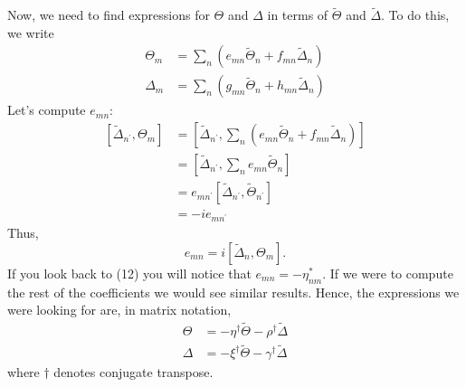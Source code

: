\documentclass[letterpaper]{article}
\newcommand{\iip}[2]{\ensuremath{\left[#1,#2\right]}}
\newcommand{\DeltaT}{\ensuremath{\tilde{\Delta}}}
\newcommand{\ThetaT}{\ensuremath{\tilde{\Theta}}}
\begin{document}
Now, we need to find expressions for $\Theta$ and $\Delta$ in terms of $\ThetaT$ and
$\DeltaT$. To do this, we write
\begin{align}
\Theta_m&=\sum_n\left(e_{mn}\ThetaT_n+f_{mn}\DeltaT_n\right)\\
\Delta_m&=\sum_n\left(g_{mn}\ThetaT_n+h_{mn}\DeltaT_n\right)
\end{align}
Let's compute $e_{mn}$:
\begin{align}
\iip{\DeltaT_{n^\prime}}{\Theta_m}&=\iip{\DeltaT_{n^\prime}}{\sum_n\left(e_{mn}\ThetaT_n+f_{mn}\DeltaT_n\right)}\\
&=\iip{\DeltaT_{n^\prime}}{\sum_n e_{mn}\ThetaT_n}\\
&=e_{mn^\prime}\iip{\DeltaT_{n^\prime}}{\ThetaT_{n^\prime}}\\
&=-ie_{mn^\prime}
\end{align}
Thus,
\begin{equation}
e_{mn}=i\iip{\DeltaT_{n}}{\Theta_m}.
\end{equation}
If you look back to (12) you will notice that $e_{mn}=-\eta_{nm}^*$. If we were to
compute the rest of the coefficients we would see similar results. Hence, the
expressions we were looking for are, in matrix notation,
\begin{align}
\Theta&=-\eta^\dagger\ThetaT-\rho^\dagger\DeltaT\\
\Delta&=-\xi^\dagger\ThetaT-\gamma^\dagger\DeltaT
\end{align}
where $\dagger$ denotes conjugate transpose.
\end{document}
